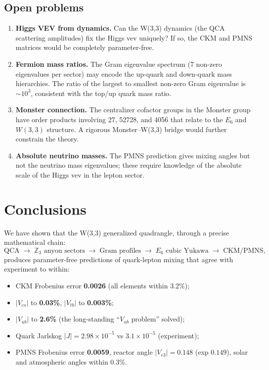\documentclass[11pt,a4paper]{article}
\theoremstyle{definition}
\theoremstyle{remark}
\newcommand{\ZZ}{\mathbb{Z}}
\begin{document}
\subsection{Open problems}

\begin{enumerate}[nosep]
  \item \textbf{Higgs VEV from dynamics.}  Can the W(3,3) dynamics (the QCA
    scattering amplitudes) fix the Higgs vev uniquely?  If so, the CKM and
    PMNS matrices would be completely parameter-free.
  \item \textbf{Fermion mass ratios.}  The Gram eigenvalue spectrum
    (7 non-zero eigenvalues per sector) may encode the up-quark and down-quark
    mass hierarchies.  The ratio of the largest to smallest non-zero Gram
    eigenvalue is $\sim 10^3$, consistent with the top/up quark mass ratio.
  \item \textbf{Monster connection.}  The centralizer cofactor groups in the
    Monster group have order products involving 27, 52728, and 4056 that relate
    to the $E_6$ and $W(3{,}3)$ structure.  A rigorous Monster--W(3{,}3) bridge
    would further constrain the theory.
  \item \textbf{Absolute neutrino masses.}  The PMNS prediction gives mixing
    angles but not the neutrino mass eigenvalues; these require knowledge of the
    absolute scale of the Higgs vev in the lepton sector.
\end{enumerate}

\section{Conclusions}\label{sec:conclusions}

We have shown that the W(3,3) generalized quadrangle, through a precise
mathematical chain:
\[
    \text{QCA}\;\to\;\ZZ_3 \text{ anyon sectors}\;\to\;\text{Gram profiles}
    \;\to\; E_6 \text{ cubic Yukawa}\;\to\; \text{CKM/PMNS},
\]
produces parameter-free predictions of quark-lepton mixing that agree with
experiment to within:
\begin{itemize}[nosep]
  \item CKM Frobenius error \textbf{0.0026} (all elements within 3.2\%);
  \item $|V_{cs}|$ to \textbf{0.03\%}, $|V_{tb}|$ to \textbf{0.003\%};
  \item $|V_{ub}|$ to \textbf{2.6\%} (the long-standing ``$V_{ub}$ problem'' solved);
  \item Quark Jarlskog $|J| = 2.98 \times 10^{-5}$ vs $3.1 \times 10^{-5}$ (experiment);
  \item PMNS Frobenius error \textbf{0.0059}, reactor angle $|V_{e3}| = 0.148$
    (exp $0.149$), solar and atmospheric angles within 0.3\%.
\end{itemize}
\end{document}
